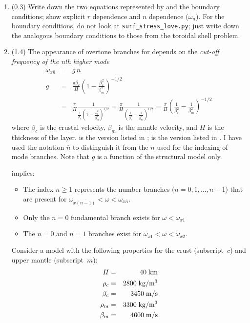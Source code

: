 \documentclass[11pt,titlepage,fleqn]{article}
\newcommand{\cutoff}[1]{{#1}_{x\bar{n}}}
\newcommand{\tfileBB}{{\tt surf\_stress\_love.py}}
\begin{document}
\begin{enumerate}

\item (0.3) Write down the two equations represented by  and the boundary conditions; show explicit $r$ dependence and $n$ dependence (\eg $\omega_n$). For the boundary conditions, do not look at \tfileBB; just write down the analogous boundary conditions to those from the toroidal shell problem.


\item (1.4) The appearance of overtone branches for  depends on the {\em cut-off frequency of the nth higher mode} 
%
\begin{eqnarray}
\cutoff{\omega} &=& g\,\bar{n}
\label{wcn}
\\
g &=& \frac{\pi\beta_c}{H} \left( 1 - \frac{\beta_c^2}{\beta_m^2}\right)^{-1/2}
\label{wcn_Aki}
\\
&=& \frac{\pi}{H} \frac{1}{\frac{1}{\beta_c}\left(1 - \frac{\beta_c^2}{\beta_m^2} \right)^{1/2}}
= \frac{\pi}{H} \frac{1}{\left(\frac{1}{\beta_c^2} - \frac{1}{\beta_m^2} \right)^{1/2}}
= \frac{\pi}{H} \left( \frac{1}{\beta_c^2} - \frac{1}{\beta_m^2} \right)^{-1/2}
\label{wcn_SW}
\end{eqnarray}
%
where $\beta_c$ is the crustal velocity, $\beta_m$ is the mantle velocity, and $H$ is the thickness of the layer.  is the version listed in \citet[][Eq. 7.8]{AkiRichardsE2};  is the version listed in  \citet[][p. 92]{SteinWysession}. I have used the notation $\bar{n}$ to distinguish it from the $n$ used for the indexing of mode branches. Note that $g$ is a function of the structural model only.

\pagebreak
{} implies:
%
\begin{itemize}
\item The index $\bar{n} \ge 1$ represents the number branches ($n = 0, 1, \ldots, \bar{n}-1$) that are present for $\omega_{x\overline{(n-1)}} < \omega < \omega_{x\bar{n}}$.
\item Only the $n=0$ fundamental branch exists for $\omega < \omega_{x1}$
\item The $n=0$ and $n=1$ branches exist for $\omega_{x1} < \omega < \omega_{x2}$.
\end{itemize}
%

Consider a model with the following properties for the crust (subscript~$c$) and upper mantle (subscript~$m$):
%
\begin{eqnarray*}
H &=& 40\;{\rm km}
\\
\rho_c &=& 2800 \;{\rm kg/m^3}
\\
\beta_c &=& 3450 \;{\rm m/s}
\\
\rho_m &=& 3300 \;{\rm kg/m^3}
\\
\beta_m &=& 4600 \;{\rm m/s}
\end{eqnarray*}


\end{enumerate}
\end{document}
